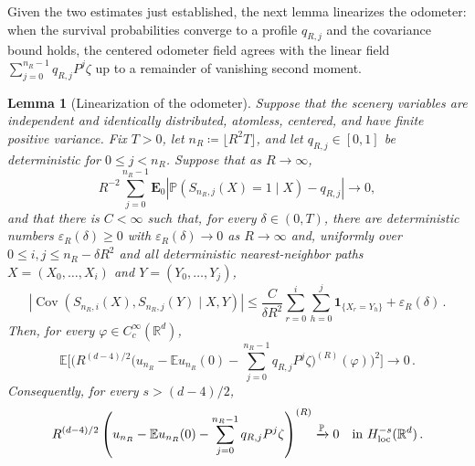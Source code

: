 \documentclass[11pt]{amsart}
\theoremstyle{plain}
\newtheorem{lemma}[theorem]{Lemma}
\theoremstyle{definition}
\newcommand{\R}{\mathbb{R}}
\newcommand{\E}{\mathbb{E}}
\renewcommand{\P}{\mathbb{P}}
\DeclareMathOperator{\Cov}{Cov}
\newcommand{\one}{\mathbf{1}}
\begin{document}
	Given the two estimates just established, the next lemma linearizes the odometer: when the
	survival probabilities converge to a profile $q_{R,j}$ and the covariance bound holds, the
	centered odometer field agrees with the linear field $\sum_{j=0}^{n_R-1}q_{R,j}P^j\zeta$ up to a
	remainder of vanishing second moment.
\begin{lemma}[Linearization of the odometer]
\label{lem:dgt4-linearization-from-survival}
	Suppose that the scenery variables are independent and identically
	distributed, atomless, centered, and have finite positive variance.
	Fix $T>0$, let $n_R\coloneqq\lfloor R^2T\rfloor$, and let
	$q_{R,j}\in[0,1]$ be deterministic for $0\leq j<n_R$. Suppose that
	as $R\to\infty$,
	\[
		R^{-2}\sum_{j=0}^{n_R-1}
		\mathbf E_0\left|
		\P(S_{n_R,j}(X)=1\mid X)-q_{R,j}
		\right|
		\longrightarrow0,
	\]
	and that there is $C<\infty$ such that, for every $\delta\in(0,T)$, there are
	deterministic numbers $\varepsilon_R(\delta)\geq0$ with
	$\varepsilon_R(\delta)\to0$ as $R\to\infty$ and, uniformly over
	$0\leq i,j\leq n_R-\delta R^2$ and all deterministic nearest-neighbor paths
	$X=(X_0,\ldots,X_i)$ and $Y=(Y_0,\ldots,Y_j)$,
	\[
		\left|
		\Cov(S_{n_R,i}(X),S_{n_R,j}(Y)\mid X,Y)
		\right|
		\leq
		\frac{C}{\delta R^2}
		\sum_{r=0}^i\sum_{h=0}^j\one_{\{X_r=Y_h\}}
		+\varepsilon_R(\delta)\, .
	\]
	Then, for every
	$\varphi\in C_c^\infty(\R^d)$,
	\begin{equation}\label{eq:dgt4-linearization-from-paths}
		\E\Biggl[\Biggl(R^{(d-4)/2}\Biggl(
		u_{n_R}-\E u_{n_R}(0)
		-\sum_{j=0}^{n_R-1}q_{R,j}P^j\zeta
		\Biggr)^{(R)}(\varphi)\Biggr)^2\Biggr]
		\longrightarrow0\, .
	\end{equation}
	Consequently, for every $s>(d-4)/2$,
	\[
		R^{(d-4)/2}
		\left(u_{n_R}-\E u_{n_R}(0)
		-\sum_{j=0}^{n_R-1}q_{R,j}P^j\zeta\right)^{(R)}
		\xrightarrow{\P}0
		\quad\text{in }H^{-s}_{\rm loc}(\R^d)\, .
	\]
\end{lemma}
\end{document}
